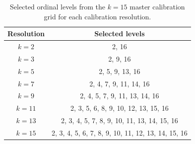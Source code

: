 
\begin{table}[t]
\centering
\caption{Selected ordinal levels from the $k=15$ master calibration grid for each calibration resolution.}
\label{tab:k_level_selection}
\begin{tabular}{cc}
\toprule
Resolution & Selected levels \\
\midrule
$k=2$ & 2, 16 \\
$k=3$ & 2, 9, 16 \\
$k=5$ & 2, 5, 9, 13, 16 \\
$k=7$ & 2, 4, 7, 9, 11, 14, 16 \\
$k=9$ & 2, 4, 5, 7, 9, 11, 13, 14, 16 \\
$k=11$ & 2, 3, 5, 6, 8, 9, 10, 12, 13, 15, 16 \\
$k=13$ & 2, 3, 4, 5, 7, 8, 9, 10, 11, 13, 14, 15, 16 \\
$k=15$ & 2, 3, 4, 5, 6, 7, 8, 9, 10, 11, 12, 13, 14, 15, 16 \\

\bottomrule
\end{tabular}
\end{table}
